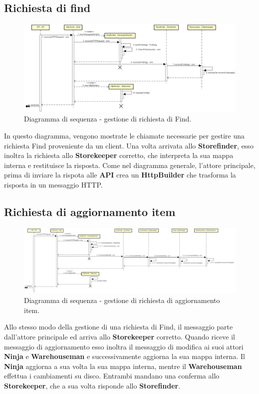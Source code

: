 \documentclass[a4paper]{article}
\begin{document}
        \subsection{Richiesta di find}
            \begin{figure} [H]
				\centering
				\includegraphics[width=\textwidth]{ST/seq/GestioneFind.png}
				\caption{Diagramma di sequenza - gestione di richiesta di Find.}
			\end{figure}
            In questo diagramma, vengono mostrate le chiamate necessarie per gestire una richiesta Find proveniente da un client. Una volta arrivata allo \textbf{Storefinder}, esso inoltra la richiesta 
            allo \textbf{Storekeeper} corretto, che interpreta la sua mappa interna e restituisce la risposta. Come nel diagramma generale, l'attore principale, prima di inviare la rispota alle 
            \textbf{API} crea un \textbf{HttpBuilder} che trasforma la risposta in un messaggio HTTP.
            
        \subsection{Richiesta di aggiornamento item}
            \begin{figure} [H]
				\centering
				\includegraphics[width=\textwidth]{ST/seq/GestioneUpdateEntry.png}
				\caption{Diagramma di sequenza - gestione di richiesta di aggiornamento item.}
			\end{figure}
            Allo stesso modo della gestione di una richiesta di Find, il messaggio parte dall'attore principale ed arriva allo \textbf{Storekeeper} corretto. Quando riceve il messaggio di 
            aggiornamento esso inoltra il messaggio di modifica ai suoi attori \textbf{Ninja} e \textbf{Warehouseman} e successivamente aggiorna la sua mappa interna. Il \textbf{Ninja} aggiorna 
            a sua volta la sua mappa interna, mentre il \textbf{Warehouseman} effettua i cambiamenti su disco. Entrambi mandano una conferma allo \textbf{Storekeeper}, che a sua volta risponde 
            allo \textbf{Storefinder}.
            
\end{document}
